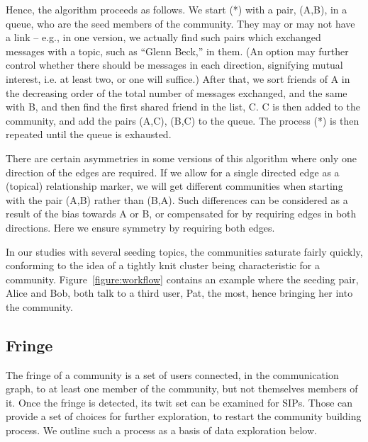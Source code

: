 Hence, the algorithm proceeds as follows.  We start (*) with a pair, (A,B), in a queue, who are the seed members of the community.  They may or may not have a link -- e.g., in one version, we actually find such pairs which exchanged messages with a topic, such as ``Glenn Beck,'' in them.  (An option may further control whether there should be messages in each direction, signifying mutual interest, i.e. at least two, or one will suffice.)  After that, we sort friends of A in the decreasing order of the total number of messages exchanged, and the same with B, and then find the first shared friend in the list, C.  C is then added to the community, and add the pairs (A,C), (B,C) to the queue.  The process (*) is then repeated until the queue is exhausted.

There are certain asymmetries in some versions of this algorithm where only one direction of the edges are required.  If we allow for a single directed edge as a (topical) relationship marker, we will get different communities when starting with the pair (A,B) rather than (B,A).  Such differences can be considered as a result of the bias towards A or B, or compensated for by requiring edges in both directions.  Here we ensure symmetry by requiring both edges.

In our studies with several seeding topics, the communities saturate fairly quickly, conforming to the idea of a tightly knit cluster \cite{Tarjan08} being characteristic for a community.  Figure~\ref{figure:workflow} contains an example where the seeding pair, Alice and Bob, both talk to a third user, Pat, the most, hence bringing her into the community.

\subsection{Fringe}

The fringe of a community is a set of users connected, in the communication graph, to at least one member of the community, but not themselves members of it.  Once the fringe is detected, its twit set can be examined for SIPs.  Those can provide a set of choices for further exploration, to restart the community building process.  We outline such a process as a basis of data exploration below.